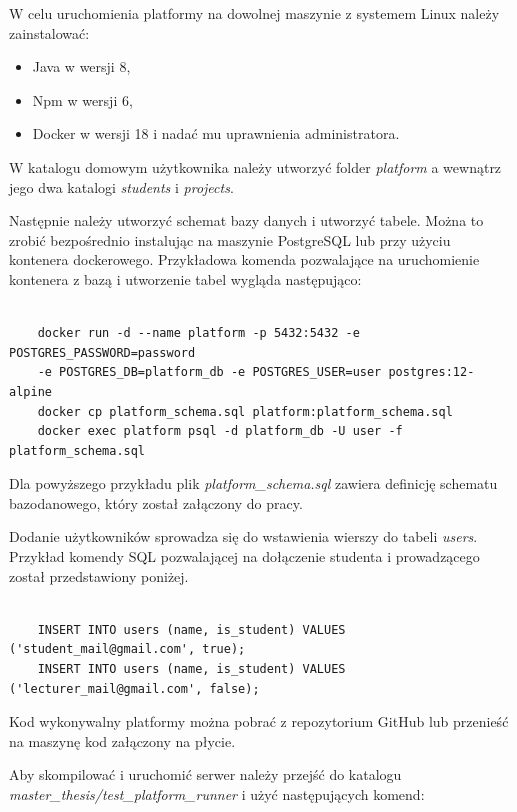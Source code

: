 W celu uruchomienia platformy na dowolnej maszynie z systemem Linux należy zainstalować:
\begin{itemize}
    \item Java w wersji 8,
    \item Npm w wersji 6,
    \item Docker w wersji 18 i nadać mu uprawnienia administratora.
\end{itemize}

W katalogu domowym użytkownika należy utworzyć folder \textit{platform} a wewnątrz jego dwa katalogi \textit{students} i \textit{projects}.

Następnie należy utworzyć schemat bazy danych i utworzyć tabele.
Można to zrobić bezpośrednio instalując na maszynie PostgreSQL lub przy użyciu kontenera dockerowego.
Przykładowa komenda pozwalające na uruchomienie kontenera z bazą i utworzenie tabel wygląda następująco:

{\selectfont
\tiny
\begin{lstlisting}

    docker run -d --name platform -p 5432:5432 -e POSTGRES_PASSWORD=password
    -e POSTGRES_DB=platform_db -e POSTGRES_USER=user postgres:12-alpine
    docker cp platform_schema.sql platform:platform_schema.sql
    docker exec platform psql -d platform_db -U user -f platform_schema.sql

\end{lstlisting}
}

Dla powyższego przykładu plik \textit{platform\_schema.sql} zawiera definicję schematu bazodanowego, który został załączony do pracy.

Dodanie użytkowników sprowadza się do wstawienia wierszy do tabeli \textit{users}.
Przykład komendy SQL pozwalającej na dołączenie studenta i prowadzącego został przedstawiony poniżej.

{\selectfont
\tiny
\begin{lstlisting}

    INSERT INTO users (name, is_student) VALUES ('student_mail@gmail.com', true);
    INSERT INTO users (name, is_student) VALUES ('lecturer_mail@gmail.com', false);

\end{lstlisting}
}

Kod wykonywalny platformy można pobrać z repozytorium GitHub lub przenieść na maszynę kod załączony na płycie.

Aby skompilować i uruchomić serwer należy przejść do katalogu \textit{master\_thesis/test\_platform\_runner} i użyć następujących komend:

